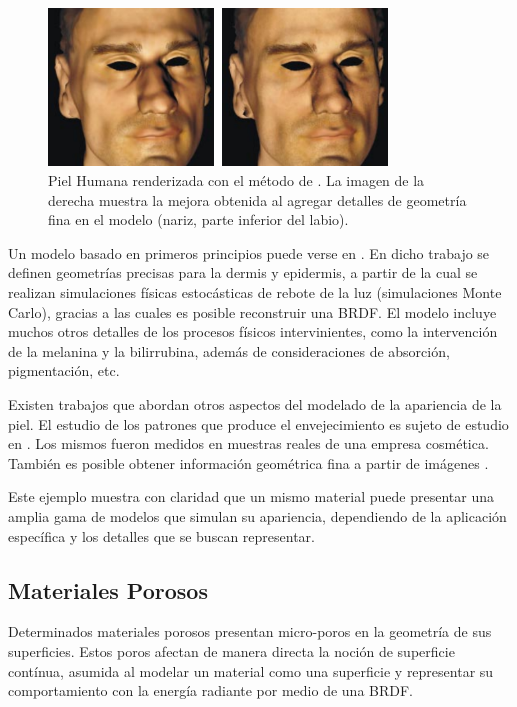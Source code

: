 \begin{figure}
\center
\includegraphics[width=9cm]{figures/piel}
\caption[Piel Humana renderizada]{Piel Humana renderizada con el método de \cite{Marschner2000}. La imagen de la derecha muestra la mejora obtenida al agregar detalles de geometría fina en el modelo (nariz, parte inferior del labio).}
\label{fg:piel}
\end{figure}

Un modelo basado en primeros principios puede verse en \cite{Krishnaswamy2004}.
En dicho trabajo se definen geometrías precisas para la dermis y epidermis, a partir de la cual se realizan simulaciones físicas estocásticas de rebote de la luz (simulaciones Monte Carlo), gracias a las cuales es posible reconstruir una BRDF.
El modelo incluye muchos otros detalles de los procesos físicos intervinientes, como la intervención de la melanina y la bilirrubina, además de consideraciones de absorción, pigmentación, etc.

Existen trabajos que abordan otros aspectos del modelado de la apariencia de la piel.
El estudio de los patrones que produce el envejecimiento es sujeto de estudio en \cite{Boissieux2000}.
Los mismos fueron medidos en muestras reales de una empresa cosmética.
También es posible obtener información geométrica fina a partir de imágenes \cite{Golovinskiy2006}.

Este ejemplo muestra con claridad que un mismo material puede presentar una amplia gama de modelos que simulan su apariencia, dependiendo de la aplicación específica y los detalles que se buscan representar.

\subsection{Materiales Porosos}

Determinados materiales porosos presentan micro-poros en la geometría de sus superficies.
Estos poros afectan de manera directa la noción de superficie contínua, asumida al modelar un material como una superficie y representar su comportamiento con la energía radiante por medio de una BRDF.

